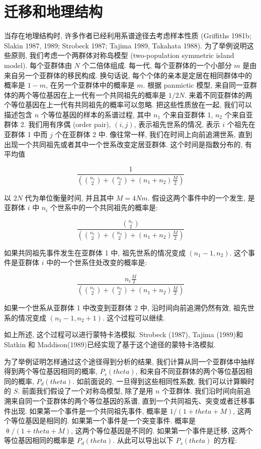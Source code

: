 \documentclass[12pt]{article}
\begin{document}
\section{迁移和地理结构}

当存在地理结构时, 许多作者已经利用系谱途径去考虑样本性质 (Griffiths 1981b; Slakin 1987, 1989; Strobeck 1987;
Tajima 1989, Takahata 1988). 为了举例说明这些原则, 我们考虑一个两群体对称岛模型 (two-population symmetric
island model). 每个亚群体由 $N$ 个二倍体组成. 每一代, 每个亚群体的一个小部分 $m$ 是由来自另一个亚群体的移民构成.
换句话说, 每个个体的亲本是定居在相同群体中的概率是 $1-m$, 在另一个亚群体中的概率是 $m$. 根据 panmictic 模型,
来自同一亚群体的两个等位基因在上一代有一个共同祖先的概率是 $1/2N$.
来着不同亚群体的两个等位基因在上一代有共同祖先的概率可以忽略. 把这些性质放在一起, 我们可以描述包含 $n$
个等位基因的样本的系谱过程, 其中 $n_{1}$ 个来自亚群体 1, $n_{2}$ 个来自亚群体 2. 我们用有序偶 (order pair),
$(i,j)$, 表示祖先世系的情况, 表示 $i$ 个祖先在亚群体 1 中而 $j$ 个在亚群体 2 中. 像往常一样,
我们在时间上向前追溯世系, 直到出现一个共同祖先或者其中一个世系改变定居亚群体. 这个时间是指数分布的, 有平均值

\begin{equation*}
    \frac{1}{(\binom{n_1}{2}+\binom{n_2}{2}+(n_{1}+n_{2})\frac{M}{2})}
\end{equation*}

以 $2N$ 代为单位衡量时间, 并且其中 $M=4Nm$. 假设这两个事件中的一个发生, 是亚群体 $i$ 中 $n_{i}$
个世系中的一个共同祖先的概率是:

\begin{equation*}
    \frac{\binom{n_i}{2}}{(\binom{n_1}{2}+\binom{n_2}{2}+(n_{1}+n_{2})\frac{M}{2})}
\end{equation*}

如果共同祖先事件发生在亚群体 1 中, 祖先世系的情况变成 $(n_{1}-1,n_{2})$. 这个事件是亚群体 $i$
中的一个世系住处改变的概率是:

\begin{equation*}
    \frac{n_{i}\frac{M}{2}}{(\binom{n_1}{2} + \binom{n_2}{2} + (n_{1}+n_{2})\frac{M}{2})}
\end{equation*}

如果一个世系从亚群体 1 中改变到亚群体 2 中, 沿时间向前追溯仍然有效, 祖先世系的情况变成 $(n_{1}-1,n_{2}+1)$.
这个过程可以继续.

如上所述, 这个过程可以进行蒙特卡洛模拟. Strobeck (1987), Tajima (1989)和 Slatkin 和
Maddison(1989)已经实现了基于这个途径的蒙特卡洛模拟.

为了举例证明怎样通过这个途径得到分析的结果, 我们计算从同一个亚群体中抽样得到两个等位基因相同的概率, $P_{s}(theta )$,
和来自不同亚群体的两个等位基因相同的概率, $P_{d}(theta )$. 如前面说的, 一旦得到这些相同性系数, 我们可以计算瞬时的 $S$.
前面我们假设了一个对称岛模型, 除了是用 $n$ 个亚群体. 我们沿时间向前追溯来自同一个亚群体的两个等位基因的系谱,
直到一个共同祖先、突变或者迁移事件出现. 如果第一个事件是一个共同祖先事件, 概率是 $1/(1+theta +M)$,
这两个等位基因是相同的. 如果第一个事件是一个突变事件. 概率是 $\uptheta /(1+theta +M)$, 这两个等位基因是不同的.
如果第一个事件是迁移, 这两个等位基因相同的概率是 $P_{d}(theta )$. 从此可以导出以下 $P_{s}(theta )$ 的方程:
\end{document}
